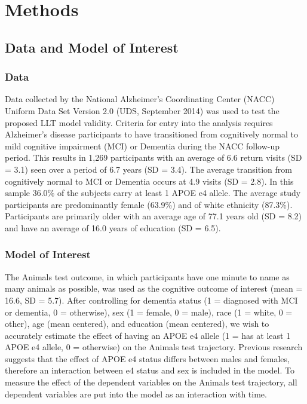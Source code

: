 \documentclass[
]{article}
\begin{document}
\hypertarget{methods}{%
\section{Methods}\label{methods}}

\hypertarget{data-and-model-of-interest}{%
\subsection{Data and Model of Interest}\label{data-and-model-of-interest}}

\hypertarget{data}{%
\subsubsection{Data}\label{data}}

Data collected by the National Alzheimer's Coordinating Center (NACC) Uniform Data Set Version 2.0 (UDS, September 2014) was used to test the proposed LLT model validity. Criteria for entry into the analysis requires Alzheimer's disease participants to have transitioned from cognitively normal to mild cognitive impairment (MCI) or Dementia during the NACC follow-up period. This results in 1,269 participants with an average of 6.6 return visits (SD = 3.1) seen over a period of 6.7 years (SD = 3.4). The average transition from cognitively normal to MCI or Dementia occurs at 4.9 visits (SD = 2.8). In this sample 36.0\% of the subjects carry at least 1 APOE e4 allele. The average study participants are predominantly female (63.9\%) and of white ethnicity (87.3\%). Participants are primarily older with an average age of 77.1 years old (SD = 8.2) and have an average of 16.0 years of education (SD = 6.5).

\hypertarget{MOI}{%
\subsubsection{Model of Interest}\label{MOI}}

The Animals test outcome, in which participants have one minute to name as many animals as possible, was used as the cognitive outcome of interest (mean = 16.6, SD = 5.7). After controlling for dementia status (1 = diagnosed with MCI or dementia, 0 = otherwise), sex (1 = female, 0 = male), race (1 = white, 0 = other), age (mean centered), and education (mean centered), we wish to accurately estimate the effect of having an APOE e4 allele (1 = has at least 1 APOE e4 allele, 0 = otherwise) on the Animals test trajectory. Previous research suggests that the effect of APOE e4 status differs between males and females, therefore an interaction between e4 status and sex is included in the model. To measure the effect of the dependent variables on the Animals test trajectory, all dependent variables are put into the model as an interaction with time.
\end{document}
